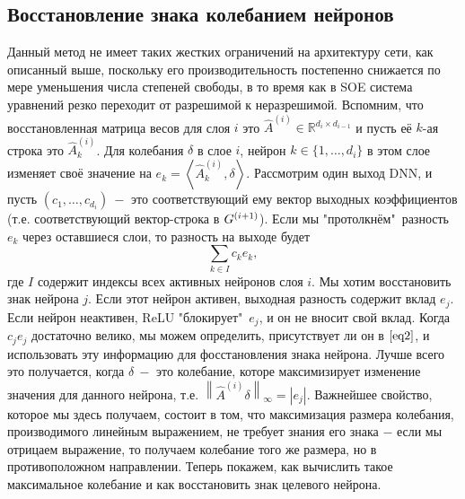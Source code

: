 \subsection{Восстановление знака колебанием нейронов}
Данный метод не имеет таких жестких ограничений на архитектуру сети, как описанный выше, поскольку его производительность постепенно снижается по мере уменьшения числа степеней свободы, в то время как в SOE система уравнений резко переходит от разрешимой к неразрешимой.
Вспомним, что восстановленная матрица весов для слоя $i$ это $\hat{A}^{\left(i\right)} \in \mathbb{R}^{d_{i} \times d_{i-1}}$ и пусть её $k$-ая строка это $\hat{A}_{k}^{\left(i\right)}$. Для колебания $\delta$ в слое $i$, нейрон $k \in \{1, \dots, d_{i}\}$ в этом слое изменяет своё значение на $e_{k} = \left \langle \hat{A}_{k}^{\left(i\right)}, \delta \right \rangle$. Рассмотрим один выход DNN, и пусть $\left(c_{1}, \dots, c_{d_{i}}\right) ~-$ это соответствующий ему вектор выходных коэффициентов (т.е. соответствующий вектор-строка в $\mathnormal{G}^{\left(i+1\right)}$). Если мы "протолкнём"\ разность $e_{k}$ через оставшиеся слои, то разность на выходе будет 
\begin{equation}
  \label{eq2} \sum_{k \in I} {c_{k} e_{k}},
\end{equation}
где $I$ содержит индексы всех активных нейронов слоя $i$. Мы хотим восстановить знак нейрона $j$. Если этот нейрон активен, выходная разность содержит вклад $e_{j}$. Если нейрон неактивен, ReLU "блокирует"\ $e_{j}$, и он не вносит свой вклад. Когда $c_{j} e_{j}$ достаточно велико, мы можем определить, присутствует ли он в $\ref{eq2}$, и использовать эту информацию для фосстановления знака нейрона. Лучше всего это получается, когда $\delta ~-$ это колебание, которе максимизирует изменение значения для данного нейрона, т.е. $\left \| \hat{A}^{\left(i\right)} \delta \right \|_{\infty} = \left | e_{j} \right |$. Важнейшее свойство, которое мы здесь получаем, состоит в том, что максимизация размера колебания, производимого линейным выражением, не требует знания его знака $-$ если мы отрицаем выражение, то получаем колебание того же размера, но в противоположном направлении. Теперь покажем, как вычислить такое максимальное колебание и как восстановить знак целевого нейрона.


